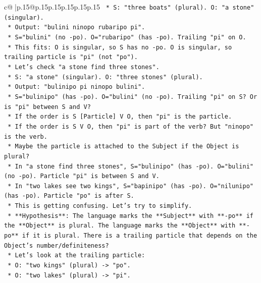 \documentclass{article}
\begin{document}
{\begin{supertabular}{c@{$\;$}|p{.15\linewidth}@{}p{.15\linewidth}p{.15\linewidth}p{.15\linewidth}p{.15\linewidth}p{.15\linewidth}}
{{{\texttt{                    *   S: "three boats" (plural). O: "a stone" (singular).} \\
\texttt{                    *   Output: "bulini ninopo rubaripo pi".} \\
\texttt{                    *   S="bulini" (no {-}po). O="rubaripo" (has {-}po). Trailing "pi" on O.} \\
\texttt{                    *   This fits: O is singular, so S has no {-}po. O is singular, so trailing particle is "pi" (not "po").} \\
\texttt{                *   Let's check "a stone find three stones".} \\
\texttt{                    *   S: "a stone" (singular). O: "three stones" (plural).} \\
\texttt{                    *   Output: "bulinipo pi ninopo bulini".} \\
\texttt{                    *   S="bulinipo" (has {-}po). O="bulini" (no {-}po). Trailing "pi" on S? Or is "pi" between S and V?} \\
\texttt{                    *   If the order is S {[}Particle{]} V O, then "pi" is the particle.} \\
\texttt{                    *   If the order is S V O, then "pi" is part of the verb? But "ninopo" is the verb.} \\
\texttt{                    *   Maybe the particle is attached to the Subject if the Object is plural?} \\
\texttt{                    *   In "a stone find three stones", S="bulinipo" (has {-}po). O="bulini" (no {-}po). Particle "pi" is between S and V.} \\
\texttt{                    *   In "two lakes see two kings", S="bapinipo" (has {-}po). O="nilunipo" (has {-}po). Particle "po" is after S.} \\
\texttt{                    *   This is getting confusing. Let's try to simplify.} \\
\texttt{                    *   **Hypothesis**: The language marks the **Subject** with **{-}po** if the **Object** is plural. The language marks the **Object** with **{-}po** if it is plural. There is a trailing particle that depends on the Object's number/definiteness?} \\
\texttt{                    *   Let's look at the trailing particle:} \\
\texttt{                        *   O: "two kings" (plural) {-}> "po".} \\
\texttt{                        *   O: "two lakes" (plural) {-}> "pi".} \\
}}}
\end{supertabular}}
\end{document}
